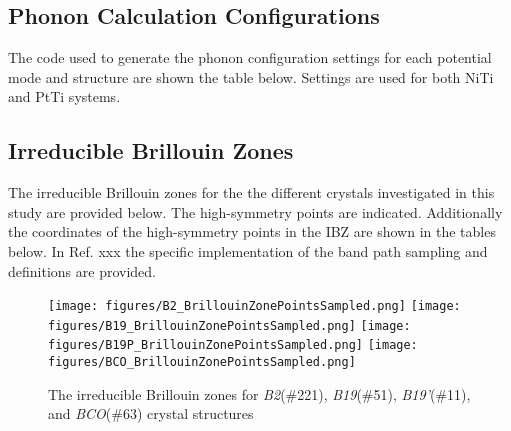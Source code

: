 \documentclass[preprint]{elsarticle}
\begin{document}

\subsection{Phonon Calculation Configurations}
\label{sec:phonon_calc_config}

The code used to generate the phonon configuration settings for each potential mode and structure are shown the table below. Settings are used for both NiTi and PtTi systems.


\subsection{Irreducible Brillouin Zones}
\label{sec:appx_ibz}

The irreducible Brillouin zones for the the different crystals investigated in this study are provided below. The high-symmetry points are indicated. Additionally the coordinates of the high-symmetry points in the IBZ are shown in the tables below. In Ref. xxx the  specific implementation of the band path sampling and definitions are provided.

\begin{figure}[!htp]                                                                                      
    \begin{centering}                                                                                    
      \texttt{[image: figures/B2\_BrillouinZonePointsSampled.png]} 
      \vspace{1mm}                                                                                       
      \texttt{[image: figures/B19\_BrillouinZonePointsSampled.png]}
      \vspace{1mm}
      \texttt{[image: figures/B19P\_BrillouinZonePointsSampled.png]}
      \vspace{1mm}
      \texttt{[image: figures/BCO\_BrillouinZonePointsSampled.png]}
      \vspace{1mm}                                                                                       
      \caption{The irreducible Brillouin zones for \textit{B2}(\#221), \textit{B19}(\#51), \textit{B19'}(\#11), and \textit{BCO}(\#63) crystal structures}                                                               \label{fig:ibz}                                                                          
    \end{centering}                                                                                      
\end{figure} 

\end{document}
